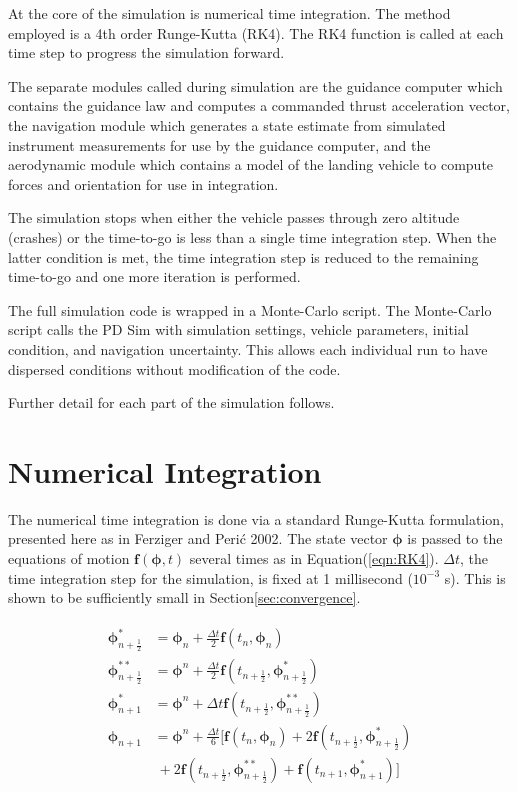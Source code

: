 At the core of the simulation is numerical time integration. The method employed is a 4th order Runge-Kutta (RK4). The RK4 function is called at each time step to progress the simulation forward.

The separate modules called during simulation are the guidance computer which contains the guidance law and computes a commanded thrust acceleration vector, the navigation module which generates a state estimate from simulated instrument measurements for use by the guidance computer, and the aerodynamic module which contains a model of the landing vehicle to compute forces and orientation for use in integration.

The simulation stops when either the vehicle passes through zero altitude (crashes) or the time-to-go is less than a single time integration step. When the latter condition is met, the time integration step is reduced to the remaining time-to-go and one more iteration is performed.

The full simulation code is wrapped in a Monte-Carlo script. The Monte-Carlo script calls the PD Sim with simulation settings, vehicle parameters, initial condition, and navigation uncertainty. This allows each individual run to have dispersed conditions without modification of the code.

Further detail for each part of the simulation follows.

\section{Numerical Integration} \label{sec:RK4}
The numerical time integration is done via a standard Runge-Kutta formulation, presented here as in Ferziger and Peri\'c 2002\:\cite{FERZIGER}. The state vector $\bm{\phi}$ is passed to the equations of motion $\bm{f}(\bm{\phi},t)$ several times as in Equation\:(\ref{eqn:RK4}). $\Delta t$, the time integration step for the simulation, is fixed at 1 millisecond ($10^{-3}$ s). This is shown to be sufficiently small in Section\:\ref{sec:convergence}.

\begin{align}
\label{eqn:RK4}
\begin{split}
\bm{\phi}_{n+\frac{1}{2}}^* &= \bm{\phi}_n + \frac{\Delta t}{2} \bm{f}(t_n,\bm{\phi}_n)\\
\bm{\phi}_{n+\frac{1}{2}}^{**} &= \bm{\phi}^n + \frac{\Delta t}{2}  \bm{f}(t_{n+\frac{1}{2}},\bm{\phi}^*_{n+\frac{1}{2}})\\
\bm{\phi}_{n+1}^* &= \bm{\phi}^n + \Delta t  \bm{f}(t_{n+\frac{1}{2}},\bm{\phi}^{**}_{n+\frac{1}{2}})\\
\bm{\phi}_{n+1} &= \bm{\phi}^n + \frac{\Delta t}{6}
[\bm{f}(t_n,\bm{\phi}_{n})
+ 2\bm{f}(t_{n+\frac{1}{2}},\bm{\phi}^*_{n+\frac{1}{2}})\\
&\:+ 2\bm{f}(t_{n+\frac{1}{2}},\bm{\phi}^{**}_{n+\frac{1}{2}})
+ \bm{f}(t_{n+1},\bm{\phi}_{n+1}^*)]
\end{split}
\end{align}


